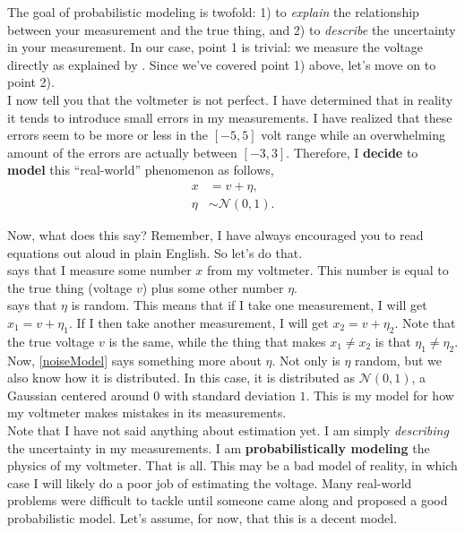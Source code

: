 \documentclass[10pt,letterpaper]{article}
\begin{document}
The goal of probabilistic modeling is twofold: 1) to \emph{explain} the relationship between your measurement and the true thing, and 2) to \emph{describe} the uncertainty in your measurement. In our case, point 1 is trivial: we measure the voltage directly as explained by . Since we've covered point 1) above, let's move on to point 2).\\

I now tell you that the voltmeter is not perfect. I have determined that in reality it tends to introduce small errors in my measurements. I have realized that these errors seem to be more or less in the $[-5, 5]$ volt range while an overwhelming amount of the errors are actually between $[-3, 3]$. Therefore, I \textbf{decide} to \textbf{model} this ``real-world'' phenomenon as follows,
\begin{align}
	x &= v + \eta, \label{measurementModel}\\
	\eta &\sim \mathcal{N}(0,1)\label{noiseModel}.
\end{align}

Now, what does this say? Remember, I have always encouraged you to read equations out aloud in plain English. So let's do that. \\

 says that I measure some number $x$ from my voltmeter. This number is equal to the true thing (voltage $v$) plus some other number $\eta$. \\

 says that $\eta$ is random. This means that if I take one measurement, I will get $x_1 = v + \eta_1$. If I then take another measurement, I will get $x_2 = v + \eta_2$. Note that the true voltage $v$ is the same, while the thing that makes $x_1 \neq x_2$ is that $\eta_1 \neq \eta_2$. \\

Now, \cref{noiseModel} says something more about $\eta$. Not only is $\eta$ random, but we also know how it is distributed. In this case, it is distributed as $\mathcal{N}(0,1)$, a Gaussian centered around $0$ with standard deviation $1$. This is my model for how my voltmeter makes mistakes in its measurements. \\

Note that I have not said anything about estimation yet. I am simply \emph{describing} the uncertainty in my measurements. I am \textbf{probabilistically modeling} the physics of my voltmeter. That is all. This may be a bad model of reality, in which case I will likely do a poor job of estimating the voltage. Many real-world problems were difficult to tackle until someone came along and proposed a good probabilistic model. Let's assume, for now, that this is a decent model.\\
\end{document}
